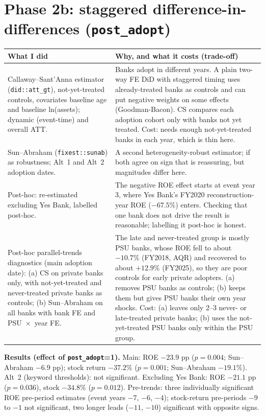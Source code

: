 \documentclass[10.5pt,a4paper]{article}
\newcommand{\var}[1]{\texttt{#1}}
\newenvironment{decisions}{%
  \begin{longtable}{L{0.36\textwidth} L{0.58\textwidth}}
  \toprule
  \textcolor{head}{\textbf{What I did}} & \textcolor{head}{\textbf{Why, and what it costs (trade-off)}}\\
  \midrule\endhead}{%
  \end{longtable}}
\newcommand{\row}[2]{#1 & #2\\ \midrule}
\begin{document}
\section{Phase 2b: staggered difference-in-differences (\var{post\_adopt})}
\begin{decisions}
\row{Callaway--Sant'Anna estimator (\var{did::att\_gt}), not-yet-treated controls, covariates baseline age and baseline
ln(assets); dynamic (event-time) and overall ATT.}
{Banks adopt in different years. A plain two-way FE DiD with staggered timing uses already-treated banks as controls
and can put negative weights on some effects (Goodman-Bacon). CS compares each adoption cohort only with banks not yet
treated. Cost: needs enough not-yet-treated banks in each year, which is thin here.}
\row{Sun--Abraham (\var{fixest::sunab}) as robustness; Alt~1 and Alt~2 adoption dates.}
{A second heterogeneity-robust estimator; if both agree on sign that is reassuring, but magnitudes differ here.}
\row{Post-hoc: re-estimated excluding Yes Bank, labelled post-hoc.}
{The negative ROE effect starts at event year 3, where Yes Bank's FY2020 reconstruction-year ROE ($-67.5\%$) enters.
Checking that one bank does not drive the result is reasonable; labelling it post-hoc is honest.}
\row{Post-hoc parallel-trends diagnostics (main adoption date): (a) CS on private banks only, with not-yet-treated and
never-treated private banks as controls; (b) Sun--Abraham on all banks with bank FE and PSU~$\times$~year FE.}
{The late and never-treated group is mostly PSU banks, whose ROE fell to about $-10.7\%$ (FY2018, AQR) and recovered to
about $+12.9\%$ (FY2025), so they are poor controls for early private adopters. (a) removes PSU banks as controls;
(b) keeps them but gives PSU banks their own year shocks. Cost: (a) leaves only 2--3 never- or late-treated private
banks; (b) uses the not-yet-treated PSU banks only within the PSU group.}
\end{decisions}
\textbf{Results (effect of \var{post\_adopt}=1).} Main: ROE $-23.9$ pp ($p=0.004$; Sun--Abraham $-6.9$ pp);
stock return $-37.2\%$ ($p=0.001$; Sun--Abraham $-19.1\%$). Alt~2 (keyword thresholds): not significant. Excluding Yes
Bank: ROE $-21.1$ pp ($p=0.036$), stock $-34.8\%$ ($p=0.012$). Pre-trends: three individually significant ROE
pre-period estimates (event years $-7$, $-6$, $-4$); stock-return pre-periods $-9$ to $-1$ not significant, two longer
leads ($-11$, $-10$) significant with opposite signs.
\end{document}
